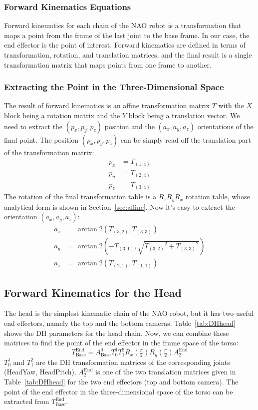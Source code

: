 \subsubsection*{Forward Kinematics Equations}
Forward kinematics for each chain of the NAO robot is a transformation that maps a point from the frame of the last joint to the base frame. In our case, the end effector is the point of interest. Forward kinematics are defined in terms of transformation, rotation, and translation matrices, and the final result is a single transformation matrix that maps points from one frame to another. 

\subsubsection*{Extracting the Point in the Three-Dimensional Space}
The result of forward kinematics is an affine transformation matrix $T$ with the $X$ block being a rotation matrix and the $Y$ block being a translation vector. We need to extract the $(p_x, p_y, p_z)$ position and the $(a_x,a_y,a_z)$ orientations of the final point. The position $(p_x, p_y, p_z)$ can be simply read off the translation part of the transformation matrix:
\begin{align*}
p_x &= T_{(1,4)}\\
p_y &= T_{(2,4)}\\
p_z &= T_{(3,4)}
\end{align*}
The rotation of the final transformation table is a $R_zR_yR_x$ rotation table, whose analytical form is shown in Section~\ref{sec:affine}. Now it's easy to extract the orientation $(a_x,a_y,a_z)$:
\begin{align*}
a_x &= \arctan\!2 \left(T_{(3,2)},T_{(3,3)}\right)\\
a_y &= \arctan\!2 \left(-T_{(3,1)},\sqrt{{T_{(3,2)}}^2 + {T_{(3,3)}}^2}\right)\\
a_z &= \arctan\!2 \left(T_{(2,1)},T_{(1,1)}\right)
\end{align*}

\subsection{Forward Kinematics for the Head}
The head is the simplest kinematic chain of the NAO robot, but it has two useful end effectors, namely the top and the bottom cameras. Table~\ref{tab:DHhead} shows the DH parameters for the head chain. Now, we can combine these matrices to find the point of the end effector in the frame space of the torso:
\[
T^\text{End}_\text{Base} = A^0_\text{Base}T^1_0T^2_1R_x(\tfrac{\pi}{2})R_y(\tfrac{\pi}{2})A^\text{End}_{2}
\]
$T^1_0$ and $T^2_1$ are the DH transformation matrices of the corresponding joints (HeadYaw, HeadPitch). $A^\text{End}_{2}$ is one of the two translation matrices given in Table~\ref{tab:DHhead} for the two end effectors (top and bottom camera). The point of the end effector in the three-dimensional space of the torso can be extracted from $T^\text{End}_\text{Base}$.


